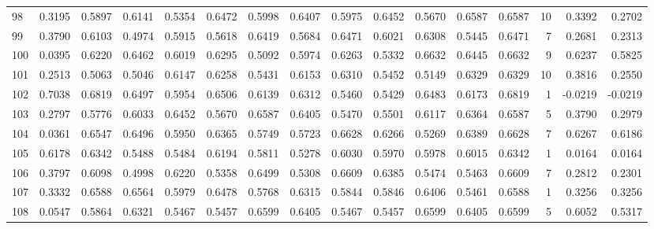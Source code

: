 \begin{tabular}{lrrrrrrrrrrrrrrr}
98  &      0.3195 &  0.5897 &  0.6141 &  0.5354 &  0.6472 &  0.5998 &  0.6407 &  0.5975 &  0.6452 &  0.5670 &   0.6587 &     0.6587 &     10 &                    0.3392 &                     0.2702 \\
99  &      0.3790 &  0.6103 &  0.4974 &  0.5915 &  0.5618 &  0.6419 &  0.5684 &  0.6471 &  0.6021 &  0.6308 &   0.5445 &     0.6471 &      7 &                    0.2681 &                     0.2313 \\
100 &      0.0395 &  0.6220 &  0.6462 &  0.6019 &  0.6295 &  0.5092 &  0.5974 &  0.6263 &  0.5332 &  0.6632 &   0.6445 &     0.6632 &      9 &                    0.6237 &                     0.5825 \\
101 &      0.2513 &  0.5063 &  0.5046 &  0.6147 &  0.6258 &  0.5431 &  0.6153 &  0.6310 &  0.5452 &  0.5149 &   0.6329 &     0.6329 &     10 &                    0.3816 &                     0.2550 \\
102 &      0.7038 &  0.6819 &  0.6497 &  0.5954 &  0.6506 &  0.6139 &  0.6312 &  0.5460 &  0.5429 &  0.6483 &   0.6173 &     0.6819 &      1 &                   -0.0219 &                    -0.0219 \\
103 &      0.2797 &  0.5776 &  0.6033 &  0.6452 &  0.5670 &  0.6587 &  0.6405 &  0.5470 &  0.5501 &  0.6117 &   0.6364 &     0.6587 &      5 &                    0.3790 &                     0.2979 \\
104 &      0.0361 &  0.6547 &  0.6496 &  0.5950 &  0.6365 &  0.5749 &  0.5723 &  0.6628 &  0.6266 &  0.5269 &   0.6389 &     0.6628 &      7 &                    0.6267 &                     0.6186 \\
105 &      0.6178 &  0.6342 &  0.5488 &  0.5484 &  0.6194 &  0.5811 &  0.5278 &  0.6030 &  0.5970 &  0.5978 &   0.6015 &     0.6342 &      1 &                    0.0164 &                     0.0164 \\
106 &      0.3797 &  0.6098 &  0.4998 &  0.6220 &  0.5358 &  0.6499 &  0.5308 &  0.6609 &  0.6385 &  0.5474 &   0.5463 &     0.6609 &      7 &                    0.2812 &                     0.2301 \\
107 &      0.3332 &  0.6588 &  0.6564 &  0.5979 &  0.6478 &  0.5768 &  0.6315 &  0.5844 &  0.5846 &  0.6406 &   0.5461 &     0.6588 &      1 &                    0.3256 &                     0.3256 \\
108 &      0.0547 &  0.5864 &  0.6321 &  0.5467 &  0.5457 &  0.6599 &  0.6405 &  0.5467 &  0.5457 &  0.6599 &   0.6405 &     0.6599 &      5 &                    0.6052 &                     0.5317 \\

\end{tabular}
